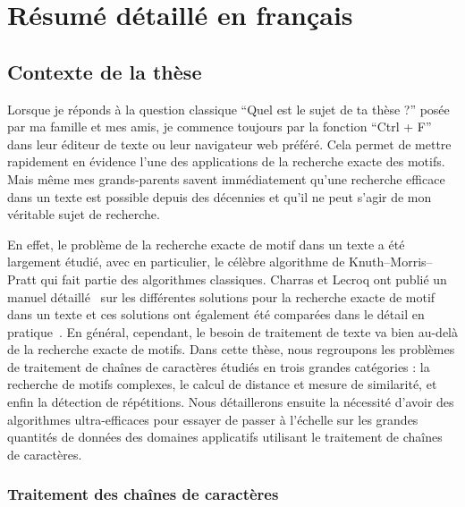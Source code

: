\chapter*{Résumé détaillé en français}\setcounter{page}{1}


\newpage

\section*{Contexte de la thèse}

Lorsque je réponds à la question classique ``Quel est le sujet de ta thèse ?'' posée par ma famille et mes amis, je commence toujours par la fonction ``Ctrl + F'' dans leur éditeur de texte ou leur navigateur web préféré. Cela permet de mettre rapidement en évidence l'une des applications de la recherche exacte des motifs.
Mais même mes grands-parents savent immédiatement qu'une recherche efficace dans un texte est possible depuis des décennies et qu'il ne peut s'agir de mon véritable sujet de recherche.

En effet, le problème de la recherche exacte de motif dans un texte a été largement étudié, avec en particulier, le célèbre algorithme de Knuth--Morris--Pratt qui fait partie des algorithmes classiques. Charras et Lecroq ont publié un manuel détaillé~\cite{Charras2004} sur les différentes solutions pour la recherche exacte de motif dans un texte et ces solutions ont également été comparées dans le détail en pratique~\cite{DBLP:journals/corr/abs-1012-2547, faro2013exact}. En général, cependant, le besoin de traitement de texte va bien au-delà de la recherche exacte de motifs. Dans cette thèse, nous regroupons les problèmes de traitement de chaînes de caractères étudiés en trois grandes catégories : la recherche de motifs complexes, le calcul de distance et mesure de similarité, et enfin la détection de répétitions. Nous détaillerons ensuite la nécessité d'avoir des algorithmes ultra-efficaces pour essayer de passer à l'échelle sur les grandes quantités de données des domaines applicatifs utilisant le traitement de chaînes de caractères.

\subsection*{Traitement des chaînes de caractères}

